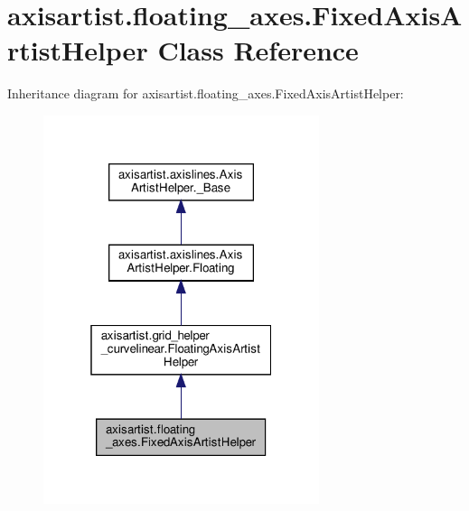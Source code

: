 \hypertarget{classaxisartist_1_1floating__axes_1_1FixedAxisArtistHelper}{}\section{axisartist.\+floating\+\_\+axes.\+Fixed\+Axis\+Artist\+Helper Class Reference}
\label{classaxisartist_1_1floating__axes_1_1FixedAxisArtistHelper}


Inheritance diagram for axisartist.\+floating\+\_\+axes.\+Fixed\+Axis\+Artist\+Helper\+:
\nopagebreak
\begin{figure}[H]
\begin{center}
\leavevmode
\includegraphics[width=229pt]{classaxisartist_1_1floating__axes_1_1FixedAxisArtistHelper__inherit__graph}
\end{center}
\end{figure}


